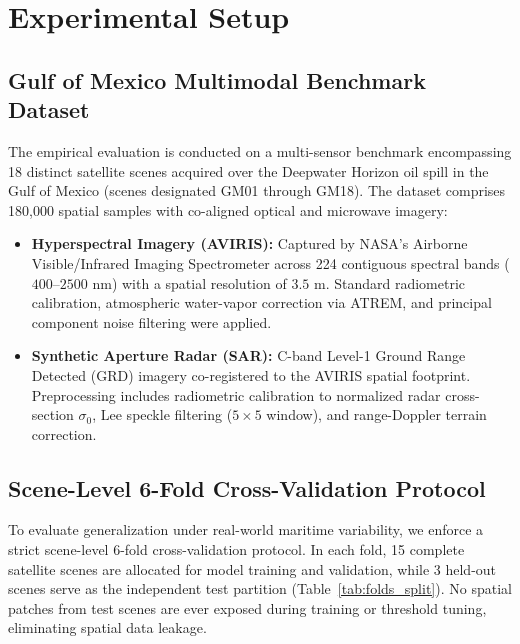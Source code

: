 \documentclass[conference]{IEEEtran}
\begin{document}
\section{Experimental Setup}
\label{sec:experimental_setup}

\subsection{Gulf of Mexico Multimodal Benchmark Dataset}
The empirical evaluation is conducted on a multi-sensor benchmark encompassing 18 distinct satellite scenes acquired over the Deepwater Horizon oil spill in the Gulf of Mexico (scenes designated GM01 through GM18). The dataset comprises 180,000 spatial samples with co-aligned optical and microwave imagery:
\begin{itemize}
    \item \textbf{Hyperspectral Imagery (AVIRIS):} Captured by NASA's Airborne Visible/Infrared Imaging Spectrometer across 224 contiguous spectral bands ($400\text{--}2500\text{ nm}$) with a spatial resolution of $3.5\text{ m}$. Standard radiometric calibration, atmospheric water-vapor correction via ATREM, and principal component noise filtering were applied.
    \item \textbf{Synthetic Aperture Radar (SAR):} C-band Level-1 Ground Range Detected (GRD) imagery co-registered to the AVIRIS spatial footprint. Preprocessing includes radiometric calibration to normalized radar cross-section $\sigma_0$, Lee speckle filtering ($5 \times 5$ window), and range-Doppler terrain correction.
\end{itemize}

\subsection{Scene-Level 6-Fold Cross-Validation Protocol}
To evaluate generalization under real-world maritime variability, we enforce a strict scene-level 6-fold cross-validation protocol. In each fold, 15 complete satellite scenes are allocated for model training and validation, while 3 held-out scenes serve as the independent test partition (Table~\ref{tab:folds_split}). No spatial patches from test scenes are ever exposed during training or threshold tuning, eliminating spatial data leakage.
\end{document}
